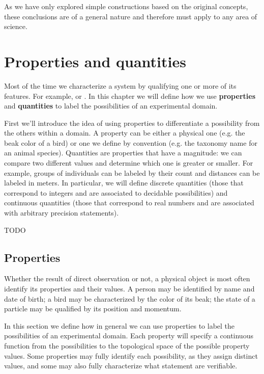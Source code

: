 \documentclass[11pt,letterpaper,fleqn]{memoir} %
\begin{document}
As we have only explored simple constructions based on the original concepts, these conclusions are of a general nature and therefore must apply to any area of science. 

\chapter{Properties and quantities}

Most of the time we characterize a system by qualifying one or more of its features. For example,  or . In this chapter we will define how we use \textbf{properties} and \textbf{quantities} to label the possibilities of an experimental domain.

First we'll introduce the idea of using properties to differentiate a possibility from the others within a domain. A property can be either a physical one (e.g. the beak color of a bird) or one we define by convention (e.g. the taxonomy name for an animal species). Quantities are properties that have a magnitude: we can compare two different values and determine which one is greater or smaller. For example, groups of individuals can be labeled by their count and distances can be labeled in meters. In particular, we will define discrete quantities (those that correspond to integers and are associated to decidable possibilities) and continuous quantities (those that correspond to real numbers and are associated with arbitrary precision statements).

TODO

\section{Properties}

Whether the result of direct observation or not, a physical object is most often identify its properties and their values. A person may be identified by name and date of birth; a bird may be characterized by the color of its beak; the state of a particle may be qualified by its position and momentum.

In this section we define how in general we can use properties to label the possibilities of an experimental domain. Each property will specify a continuous function from the possibilities to the topological space of the possible property values. Some properties may fully identify each possibility, as they assign distinct values, and some may also fully characterize what statement are verifiable.
\end{document}
